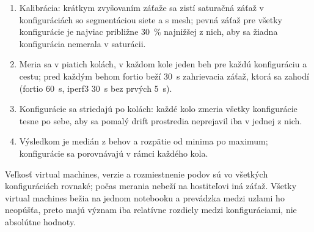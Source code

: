 \begin{enumerate}
  \item Kalibrácia: krátkym zvyšovaním záťaže sa zistí saturačná záťaž v konfiguráciách so segmentáciou siete a s mesh; pevná záťaž pre všetky konfigurácie je najviac približne 30~\% najnižšej z nich, aby sa žiadna konfigurácia nemerala v saturácii.
  \item Meria sa v piatich kolách, v každom kole jeden beh pre každú konfiguráciu a cestu; pred každým behom fortio beží 30~s zahrievacia záťaž, ktorá sa zahodí (fortio 60~s, iperf3 30~s bez prvých 5~s).
  \item Konfigurácie sa striedajú po kolách: každé kolo zmeria všetky konfigurácie tesne po sebe, aby sa pomalý drift prostredia neprejavil iba v jednej z nich.
  \item Výsledkom je medián z behov a rozpätie od minima po maximum; konfigurácie sa porovnávajú v rámci každého kola.
\end{enumerate}

Veľkosť virtual machines, verzie a rozmiestnenie podov sú vo všetkých konfiguráciách rovnaké; počas merania nebeží na hostiteľovi iná záťaž. Všetky virtual machines bežia na jednom notebooku a prevádzka medzi uzlami ho neopúšťa, preto majú význam iba relatívne rozdiely medzi konfiguráciami, nie absolútne hodnoty.
